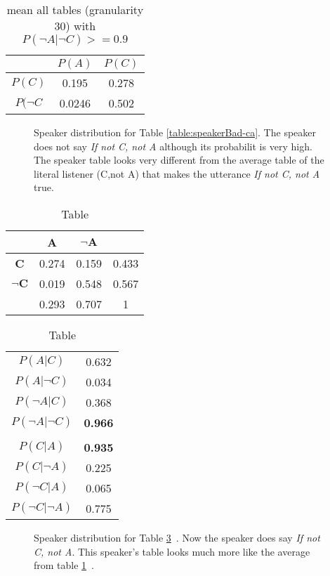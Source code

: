 \documentclass[10pt,a4paper]{article}
\begin{document}
\begin{table}[h]
\centering
\begin{tabular}{c|c|c} 
           & $P(A)$ & $P(C)$ \\ \hline 
$P(C)$     &  0.195 & 0.278 \\ 
$P(\neg C$ &  0.0246 & 0.502
\end{tabular}
\caption{mean all tables (granularity 30) with $P(\neg A|\neg C)>=0.9$}
\label{table:mean-pnanc}
\end{table}

\begin{figure}[htp!]
\centering
\subfloat[]{\label{fig:speakerbad-ca}}
\caption{Speaker distribution for Table \ref{table:speakerBad-ca}. The speaker does not say \textit{If not C, not A} although its probabilit is very high. The speaker table looks very different from the average table of the literal listener (C,not A) that makes the utterance \textit{If not C, not A} true.}
\end{figure}

\FloatBarrier
\newpage

\begin{table}[h]
\begin{tabular}{c|cc|c}
		   			& \textbf{A} & $\boldsymbol{\neg A}$ & \\\hline
\textbf{C} 			& 0.274 & 0.159 & 0.433 \\
$\boldsymbol{\neg C}$	& 0.019 & 0.548 & 0.567 \\ \hline
					& 0.293 & 0.707 & 1
\end{tabular}
\qquad
\begin{tabular}{c|c}
$P(A|C)$ & 0.632 \\
$P(A|\neg C)$ & 0.034\\
$P(\neg A|C)$ & 0.368\\
$P(\neg A|\neg C)$ & \textbf{0.966}\\
& \\\hline
$P(C|A)$ & \textbf{0.935}\\
$P(C|\neg A)$ & 0.225\\
$P(\neg C|A)$ & 0.065\\
$P(\neg C|\neg A)$ & 0.775
\end{tabular}
\caption{Table}
\label{table:speakerGood-ca}
\end{table}


\begin{figure}
\centering
\subfloat[]{\label{fig:speakerGood-ca}} 
\caption{Speaker distribution for Table \ref{table:speakerGood-ca}~. Now the speaker does say \textit{If not C, not A}. This speaker's table looks much more like the average from table \ref{table:mean-pnanc}~.}
\end{figure}
\end{document}
